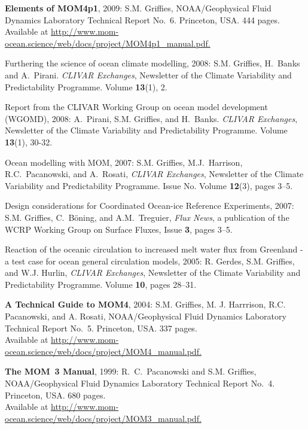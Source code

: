 \begin{etaremune}
\item {\bf Elements of MOM4p1}, 2009: S.M. Grif\/f\/ies,
  NOAA/Geophysical Fluid Dynamics Laboratory Technical Report No.\ 6. Princeton, USA.  444 pages.  Available at \href{http://www.mom-ocean.science/web/docs/project/MOM4p1_manual.pdf}{http://www.mom-ocean.science/web/docs/project/MOM4p1\_manual.pdf.}
  
\item Furthering the science of ocean climate modelling, 2008: S.M. Grif\/f\/ies, H.\ Banks and A.\ Pirani.  {\em CLIVAR Exchanges}, Newsletter of the Climate Variability and Predictability Programme.  Volume {\bf 13}(1), 2.

\item Report from the CLIVAR Working Group on ocean model development (WGOMD), 2008: A.\ Pirani, S.M. Grif\/f\/ies, and H.\ Banks. {\em CLIVAR Exchanges}, Newsletter of the Climate Variability and Predictability Programme.  Volume {\bf 13}(1), 30-32.

\item Ocean modelling with MOM, 2007: S.M. Grif\/f\/ies, M.J.\ Harrison, R.C.\ Pacanowski, and A.\ Rosati, {\em CLIVAR Exchanges}, Newsletter of the Climate Variability and Predictability Programme. Issue No. Volume {\bf 12}(3), pages 3--5.

\item Design considerations for Coordinated Ocean-ice Reference Experiments, 2007: S.M. Grif\/f\/ies, C.\ B\"oning, and A.M.\ Treguier, {\em Flux News}, a publication of the WCRP Working Group on Surface Fluxes, Issue {\bf 3}, pages 3--5.

\item Reaction of the oceanic circulation to increased melt water flux from Greenland - a test case for ocean general circulation models, 2005: R. Gerdes, S.M. Grif\/f\/ies, and W.J. Hurlin, {\em CLIVAR Exchanges}, Newsletter of the Climate Variability and Predictability Programme.  Volume {\bf 10}, pages 28--31.

\item {\bf A Technical Guide to MOM4}, 2004: S.M. Grif\/f\/ies, M. J. Harrrison, R.C. Pacanowski, and A. Rosati, NOAA/Geophysical Fluid Dynamics Laboratory Technical Report No.\ 5. Princeton, USA. 337 pages.  \\
Available at  \href{http://www.mom-ocean.science/web/docs/project/MOM4_manual.pdf}{http://www.mom-ocean.science/web/docs/project/MOM4\_manual.pdf.}

\item {\bf The MOM~3 Manual}, 1999: R.\ C.\ Pacanowski and S.M. Grif\/f\/ies,  NOAA/Geophysical Fluid Dynamics Laboratory Technical Report No.\ 4. Princeton, USA.  680 pages.  \\ Available at
\href{http://www.mom-ocean.science/web/docs/project/MOM3_manual.pdf}{http://www.mom-ocean.science/web/docs/project/MOM3\_manual.pdf.}
  

\end{etaremune}
